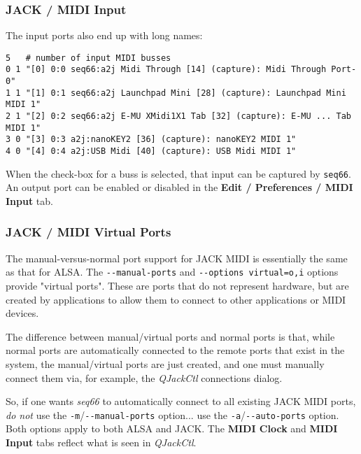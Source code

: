 \subsubsection{JACK / MIDI Input}
\label{subsubsec:jack_midi_input}

   The input ports also end up with long names:

   \begin{verbatim}
5   # number of input MIDI busses
0 1 "[0] 0:0 seq66:a2j Midi Through [14] (capture): Midi Through Port-0"
1 1 "[1] 0:1 seq66:a2j Launchpad Mini [28] (capture): Launchpad Mini MIDI 1"
2 1 "[2] 0:2 seq66:a2j E-MU XMidi1X1 Tab [32] (capture): E-MU ... Tab MIDI 1"
3 0 "[3] 0:3 a2j:nanoKEY2 [36] (capture): nanoKEY2 MIDI 1"
4 0 "[4] 0:4 a2j:USB Midi [40] (capture): USB Midi MIDI 1"
   \end{verbatim}

   When the check-box for a buss is selected, that input can be captured by
   \texttt{seq66}.
   An output port can be enabled or disabled in the 
	\textbf{Edit / Preferences / MIDI Input} tab.

\subsubsection{JACK / MIDI Virtual Ports}
\label{subsubsec:jack_midi_virtual_ports}

   The manual-versus-normal port support for JACK MIDI is essentially the same
   as that for ALSA.
   The \texttt{-{}-manual-ports} and
   \texttt{-{}-options virtual=o,i} options provide
   "virtual ports".  These are ports that do not represent
   hardware, but are created by applications to allow them to connect to other
   applications or MIDI devices.

   The difference between manual/virtual ports and normal ports is that, while
   normal ports are automatically connected to the remote ports that exist in
   the system, the manual/virtual ports are just created, and one must
   manually connect them via, for example, the
   \textsl{QJackCtl} connections dialog.

   So, if one wants \textsl{seq66} to automatically connect to all existing
   JACK MIDI ports, \textsl{do not} use the
   \texttt{-m}/\texttt{-{}-manual-ports} option... use the
   \texttt{-a}/\texttt{-{}-auto-ports} option.  Both options apply to both
   ALSA and JACK.
   The \textbf{MIDI Clock} and \textbf{MIDI Input} tabs reflect
   what is seen in \textsl{QJackCtl}.

